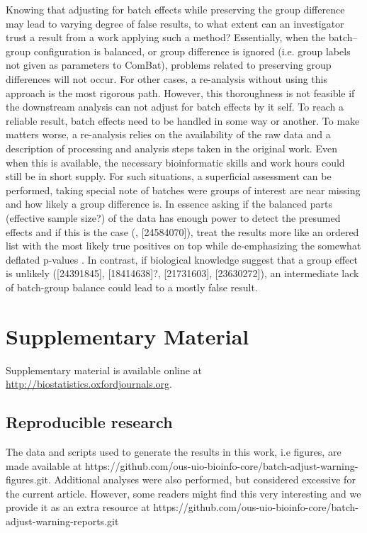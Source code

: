 \documentclass{bio}
\newcommand\CITE[1]{\textcolor{CITEcol}{[#1]}}
\begin{document}
Knowing that adjusting for batch effects while preserving the group difference may lead to varying degree of false results, to what extent can an investigator trust a result from a work applying such a method? Essentially, when the batch--group configuration is balanced, or group difference is ignored  (i.e. group labels not given as parameters to ComBat), problems related to preserving group differences will not occur. For other cases, a re-analysis without using this approach is the most rigorous path. However, this thoroughness is not feasible if the downstream  analysis can not adjust for batch effects by it self. To reach a reliable result, batch effects need to be handled in some way or another. To make matters worse, a re-analysis relies on the availability of the raw data and a description of processing and analysis steps taken in the original work. Even when this is available, the necessary bioinformatic skills and work hours could still be in short supply. For such situations, a superficial assessment can be performed, taking special note of batches were groups of interest are near missing and how likely a group difference is. In essence asking if the balanced parts (effective sample size?) of the data has enough power to detect the presumed effects and if this is the case (\citealp{Johnson2007}, \CITE{24584070}), treat the results more like an ordered list with the most likely true positives on top while de-emphasizing the somewhat deflated p-values . In contrast, if biological knowledge suggest that a group effect is unlikely  (\CITE{24391845}, \CITE{18414638}?, \CITE{21731603}, \CITE{23630272}), an intermediate lack of batch-group balance  could lead to a mostly false result.



\section{Supplementary Material}
\label{supp}

Supplementary material is available online at
\href{http://biostatistics.oxfordjournals.org}%
{http://biostatistics.oxfordjournals.org}.


\subsection{Reproducible research}

The data and scripts used to generate the results in this work, i.e figures, are made available at https://github.com/ous-uio-bioinfo-core/batch-adjust-warning-figures.git. Additional analyses were also performed, but considered excessive for the current  article. However, some readers might find this very interesting and we provide it as an extra resource at https://github.com/ous-uio-bioinfo-core/batch-adjust-warning-reports.git
\end{document}
